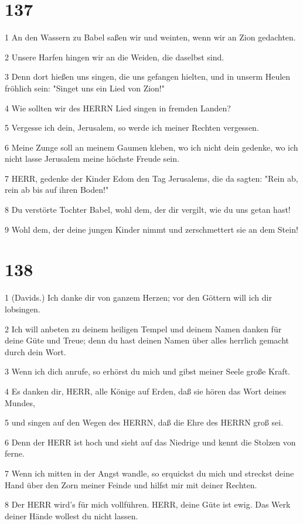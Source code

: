 \chapter{137}

\par 1 An den Wassern zu Babel saßen wir und weinten, wenn wir an Zion gedachten.
\par 2 Unsere Harfen hingen wir an die Weiden, die daselbst sind.
\par 3 Denn dort hießen uns singen, die uns gefangen hielten, und in unserm Heulen fröhlich sein: "Singet uns ein Lied von Zion!"
\par 4 Wie sollten wir des HERRN Lied singen in fremden Landen?
\par 5 Vergesse ich dein, Jerusalem, so werde ich meiner Rechten vergessen.
\par 6 Meine Zunge soll an meinem Gaumen kleben, wo ich nicht dein gedenke, wo ich nicht lasse Jerusalem meine höchste Freude sein.
\par 7 HERR, gedenke der Kinder Edom den Tag Jerusalems, die da sagten: "Rein ab, rein ab bis auf ihren Boden!"
\par 8 Du verstörte Tochter Babel, wohl dem, der dir vergilt, wie du uns getan hast!
\par 9 Wohl dem, der deine jungen Kinder nimmt und zerschmettert sie an dem Stein!

\chapter{138}

\par 1 (Davids.) Ich danke dir von ganzem Herzen; vor den Göttern will ich dir lobsingen.
\par 2 Ich will anbeten zu deinem heiligen Tempel und deinem Namen danken für deine Güte und Treue; denn du hast deinen Namen über alles herrlich gemacht durch dein Wort.
\par 3 Wenn ich dich anrufe, so erhörst du mich und gibst meiner Seele große Kraft.
\par 4 Es danken dir, HERR, alle Könige auf Erden, daß sie hören das Wort deines Mundes,
\par 5 und singen auf den Wegen des HERRN, daß die Ehre des HERRN groß sei.
\par 6 Denn der HERR ist hoch und sieht auf das Niedrige und kennt die Stolzen von ferne.
\par 7 Wenn ich mitten in der Angst wandle, so erquickst du mich und streckst deine Hand über den Zorn meiner Feinde und hilfst mir mit deiner Rechten.
\par 8 Der HERR wird's für mich vollführen. HERR, deine Güte ist ewig. Das Werk deiner Hände wollest du nicht lassen.

